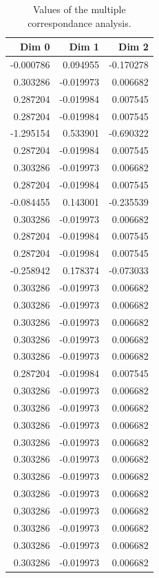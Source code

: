 \documentclass[a4paper,twoside,12pt]{book}
\begin{document}
\begin{appendices}
\begin{table}
\centering
\caption{Values of the multiple correspondance analysis.}
\label{id:tab:MCAValues}
\begin{tabular}{rrr}
	\toprule
		Dim 0 &     Dim 1 &     Dim 2 \\
	\midrule
	-0.000786 &  0.094955 & -0.170278 \\
	 0.303286 & -0.019973 &  0.006682 \\
	 0.287204 & -0.019984 &  0.007545 \\
	 0.287204 & -0.019984 &  0.007545 \\
	-1.295154 &  0.533901 & -0.690322 \\
	 0.287204 & -0.019984 &  0.007545 \\
	 0.303286 & -0.019973 &  0.006682 \\
	 0.287204 & -0.019984 &  0.007545 \\
	-0.084455 &  0.143001 & -0.235539 \\
	 0.303286 & -0.019973 &  0.006682 \\
	 0.287204 & -0.019984 &  0.007545 \\
	 0.287204 & -0.019984 &  0.007545 \\
	-0.258942 &  0.178374 & -0.073033 \\
	 0.303286 & -0.019973 &  0.006682 \\
	 0.303286 & -0.019973 &  0.006682 \\
	 0.303286 & -0.019973 &  0.006682 \\
	 0.303286 & -0.019973 &  0.006682 \\
	 0.303286 & -0.019973 &  0.006682 \\
	 0.287204 & -0.019984 &  0.007545 \\
	 0.303286 & -0.019973 &  0.006682 \\
	 0.303286 & -0.019973 &  0.006682 \\
	 0.303286 & -0.019973 &  0.006682 \\
	 0.303286 & -0.019973 &  0.006682 \\
	 0.303286 & -0.019973 &  0.006682 \\
	 0.303286 & -0.019973 &  0.006682 \\
	 0.303286 & -0.019973 &  0.006682 \\
	 0.303286 & -0.019973 &  0.006682 \\
	 0.303286 & -0.019973 &  0.006682 \\
	 0.303286 & -0.019973 &  0.006682 \\
	 0.303286 & -0.019973 &  0.006682 \\

\end{tabular}
\end{table}
\end{appendices}
\end{document}
